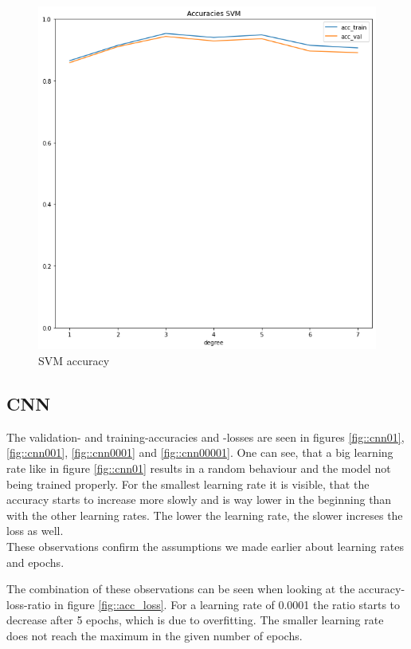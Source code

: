 \documentclass[12pt,a4paper]{scrartcl}		%
\begin{document}
        \begin{figure}[h]
            \centering
            \includegraphics[scale = 0.45]{acc_svm.png}
            \caption{SVM accuracy}
            \label{fig::acc_svm}
        \end{figure} 

    \subsection{CNN}
        The validation- and training-accuracies and -losses are seen in figures 
        \ref{fig::cnn01}, \ref{fig::cnn001}, \ref{fig::cnn0001} and \ref{fig::cnn00001}.
        One can see, that a big learning rate like in figure \ref{fig::cnn01} results in a random behaviour and the model not being 
        trained properly. For the smallest learning rate it is visible, that the accuracy starts to increase more slowly and is way lower 
        in the beginning than with the other learning rates.
        The lower the learning rate, the slower increses the loss as well.\\
        These observations confirm the assumptions we made earlier about learning rates and epochs.

        The combination of these observations can be seen when looking at the accuracy-loss-ratio in figure \ref{fig::acc_loss}.
        For a learning rate of 0.0001 the ratio starts to decrease after 5 epochs, which is due to overfitting. The smaller learning rate does 
        not reach the maximum in the given number of epochs.
\end{document}

